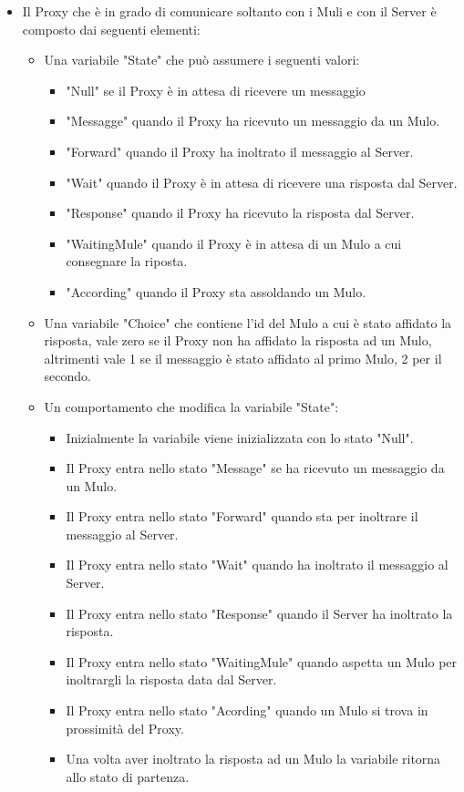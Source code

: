 \documentclass[13pt,a4paper]{article}
\begin{document}
\begin{itemize}
	
	\item Il Proxy che è in grado di comunicare soltanto con i Muli e con il Server è composto dai seguenti elementi: 
	\begin{itemize}
		\item Una variabile "State" che può assumere i seguenti valori:
		\begin{itemize}
			\item "Null" se il Proxy è in attesa di ricevere un messaggio
			\item "Messagge" quando il Proxy ha ricevuto un messaggio da un Mulo.
			\item "Forward" quando il Proxy ha inoltrato il messaggio al Server.
			\item "Wait" quando il Proxy è in attesa di ricevere una risposta dal Server.
			\item "Response" quando il Proxy ha ricevuto la risposta dal Server.
			\item "WaitingMule" quando il Proxy è in attesa di un Mulo a cui consegnare la riposta. 
			\item "According" quando il Proxy sta assoldando un Mulo.
		\end{itemize}
		\item Una variabile "Choice" che contiene l'id del Mulo a cui è stato affidato la risposta, vale zero se il Proxy non ha  affidato la risposta ad un Mulo, altrimenti vale 1 se il messaggio è stato affidato al primo Mulo, 2 per il secondo.
		\item Un comportamento che modifica la variabile "State":
		\begin{itemize}
			\item Inizialmente la variabile viene inizializzata con lo stato "Null".
			\item Il Proxy entra nello stato "Message" se ha ricevuto un messaggio da un Mulo.
			\item Il Proxy entra nello stato "Forward" quando sta per inoltrare il messaggio al Server.
			\item Il Proxy entra nello stato "Wait" quando ha inoltrato il messaggio al Server.
			\item Il Proxy entra nello stato "Response" quando il Server ha inoltrato la risposta.
			\item Il Proxy entra nello stato "WaitingMule" quando aspetta un Mulo per inoltrargli la risposta data dal Server.
			\item Il Proxy entra nello stato "Acording" quando un Mulo si trova in prossimità del Proxy.
			\item Una volta aver inoltrato la risposta ad un Mulo la variabile ritorna allo stato di partenza.

\end{itemize}
\end{itemize}
\end{itemize}
\end{document}
